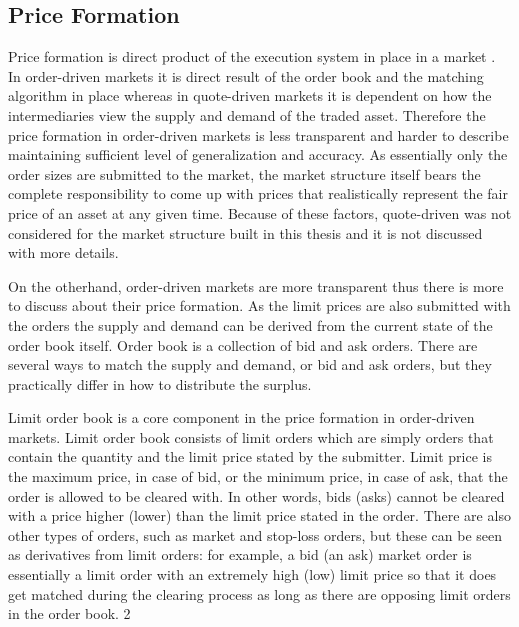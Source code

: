 \subsection{Price Formation}
Price formation is direct product of the execution system in place in a market
\citep{boer05}. In order-driven markets it is direct result of the order book and
the matching algorithm in place whereas in quote-driven markets it
is dependent on how the intermediaries view the supply and demand of the traded
asset. Therefore the price formation in order-driven markets is less transparent 
and harder to describe maintaining sufficient level of generalization and accuracy.
As essentially only the order sizes are submitted to the market, the market
structure itself bears the complete responsibility to come up with prices that realistically
represent the fair price of an asset at any given time. Because of these 
factors, quote-driven was not considered for the market structure built in this
thesis and it is not discussed with more details.

On the otherhand, order-driven markets are more transparent thus there is more
to discuss about their price formation. As the limit prices are also submitted with 
the orders the supply and demand can be derived from the current state of the 
order book itself. Order book is a collection of bid and ask orders. There are several ways 
to match the supply and demand, or bid and ask orders, but they practically differ 
in how to distribute the surplus.

Limit order book is a core component in the price formation in order-driven markets.
Limit order book consists of limit orders which are simply orders that contain the quantity and 
the limit price stated by the submitter. Limit price is the maximum price, in case of bid, or the minimum
price, in case of ask, that the order is allowed to be cleared with. In other words,
bids (asks) cannot be cleared with a price higher (lower) than the limit price stated 
in the order. There are also other types of orders, such as market and 
stop-loss orders, but these can be seen as derivatives from limit orders: 
for example, a bid (an ask) market order is essentially a limit order 
with an extremely high (low) limit price so that it does get matched 
during the clearing process as long as there are opposing limit orders in the 
order book. \citep{lob13}2 %


